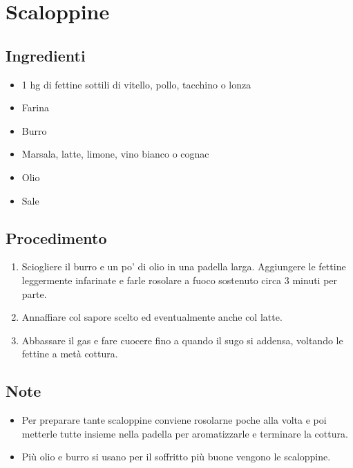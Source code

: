 \section{Scaloppine}
\subsection{Ingredienti}
\begin{itemize}
\item 1 hg di fettine sottili di vitello, pollo, tacchino o lonza  
\item Farina  
\item Burro  
\item Marsala, latte, limone, vino bianco o cognac   
\item Olio  
\item Sale
\end{itemize}
\subsection{Procedimento}
\begin{enumerate}
\item  Sciogliere il burro e un po' di olio in una padella larga. Aggiungere le fettine leggermente infarinate e farle rosolare a fuoco sostenuto circa 3 minuti per parte.  
\item  Annaffiare col sapore scelto ed eventualmente anche col latte.  
\item  Abbassare il gas e fare cuocere fino a quando il sugo si addensa, voltando le fettine a metà cottura.
\end{enumerate}
\subsection{Note}
\begin{itemize}
\item Per preparare tante scaloppine conviene rosolarne poche alla volta e poi metterle tutte insieme nella padella per aromatizzarle e terminare la cottura.  
\item Più olio e burro si usano per il soffritto più buone vengono le scaloppine.
\end{itemize}
